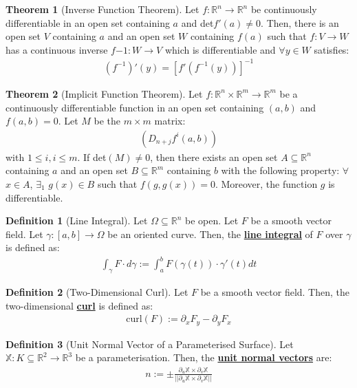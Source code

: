 \documentclass[11pt]{scrartcl}
\newcommand{\R}[0]{\mathbb{R}}
\theoremstyle{definition}
\newtheorem{theorem}{Theorem}
\newtheorem{definition}{Definition}
\theoremstyle{remark}
\newcommand{\dfn}[1]{\textbf{\underline{#1}}}
\newcommand{\idx}[2]{\int_{#1}^{#2}}
\begin{document}
{\begin{theorem}[Inverse Function Theorem]
	Let $f: \R^n \rightarrow \R^n$ be continuously differentiable in an open set containing $a$ and det$f'(a) \neq 0$. Then, there is an open set $V$ containing $a$ and an open set $W$  containing $f(a)$ such that $f: V \rightarrow W$ has a continuous inverse $f{-1}: W \rightarrow V$ which is differentiable and $\forall y \in W$ satisfies: 
	\begin{align}
		(f^{-1})'(y) = [ f'(f^{-1}(y))]^{-1} 	
	\end{align}
\end{theorem}

\begin{theorem}[Implicit Function Theorem]
	Let $f: \R^n \times \R^m \rightarrow \R^m$ be a continuously differentiable function in an open set containing $(a,b)$ and $f(a,b) =0$. Let $M$ be the $m \times m$ matrix: 
	\begin{align*}
		(D_{n+j}f^i (a,b)) 
	\end{align*}
	with $1 \leq i, i \leq m$. If det$(M) \neq 0 $, then there exists an open set $A \subseteq \R^n$ containing $a$ and an open set $B \subseteq \R^m$ containing $b$ with the following property: $\forall$ $ x \in A$, $\exists_1$ $g(x) \in B$ such that $f(g, g(x) ) =0$. Moreover, the function $g$ is differentiable. 
\end{theorem} 	


\begin{definition}[Line Integral]
	Let $\Omega \subseteq \R^n$ be open. Let $F$ be a smooth vector field. Let $\gamma: [a,b] \rightarrow \Omega$ be an oriented curve. Then, the \dfn{line integral} of $F$ over $\gamma$ is defined as: 
	\begin{align*}
		\idx{\gamma}{} F \cdot d\gamma := \idx{a}{b} F(\gamma(t)) \cdot \gamma'(t) dt 
	\end{align*}
\end{definition}

\begin{definition}[Two-Dimensional Curl]
	Let $F$ be a smooth vector field. Then, the two-dimensional \dfn{curl} is defined as: 
	\begin{align*}
		\text{curl} (F) := \partial_x F_y - \partial_y F_x 
	\end{align*}
\end{definition}


\begin{definition}[Unit Normal Vector of a Parameterised Surface] 
	Let $\mathbb{X}: K \subseteq \R^2 \rightarrow \R^3$ be a parameterisation. Then, the \dfn{unit normal vectors} are: 
	\begin{align*}
		n := \pm \frac{\partial_u \mathbb{X} \times \partial_v \mathbb{X}}{|| \partial_u \mathbb{X} \times \partial_v \mathbb{X} ||}
	\end{align*}
\end{definition}

}
\end{document}
